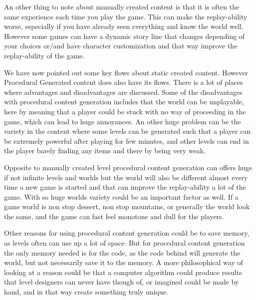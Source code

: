 An other thing to note about manually created content is that it is often the same experience each time you play the game. This can make the replay-ability worse, especially if you have already seen everything and know the world well. However some games can have a dynamic story line that changes depending of your choices or/and have character customization and that way improve the replay-ability of the game.

We have now pointed out some key flows about static created content. However Procedural Generated content does also have its flows. There is a lot of places where advantages and disadvantages are discussed. Some of the disadvantages with procedural content generation includes that the world can be unplayable, here by meaning that a player could be stuck with no way of proceeding in the game, which can lead to huge annoyances. An other huge problem can be the variety in the content where some levels can be generated such that a player can be extremely powerful after playing for few minutes, and other levels can end in the player barely finding any items and there by being very weak.

Opposite to manually created level procedural content generation can offers huge if not infinite levels and worlds but the world will also be different almost every time a new game is started and that can improve the replay-ability a lot of the game. With so huge worlds variety could be an important factor as well. If a game world is non stop dessert, non stop mountains, or generally the world look the same, and the game can fast feel monotone and dull for the players.

Other reasons for using procedural content generation could be to save memory, as levels often can use up a lot of space. But for procedural content generation the only memory needed is for the code, as the code behind will generate the world, but not necessarily save it to the memory. A more philosophical way of looking at a reason could be that a computer algorithm could produce results that level designers can never have though of, or imagined could be made by hand, and in that way create something truly unique.